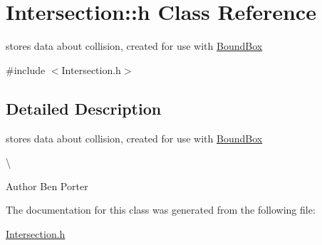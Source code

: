 \hypertarget{class_intersection_1_1h}{}\section{Intersection\+:\+:h Class Reference}
\label{class_intersection_1_1h}


stores data about collision, created for use with \hyperlink{class_bound_box}{Bound\+Box}  




{\ttfamily \#include $<$Intersection.\+h$>$}



\subsection{Detailed Description}
stores data about collision, created for use with \hyperlink{class_bound_box}{Bound\+Box} 

\textbackslash{}

\begin{DoxyAuthor}{Author}
Ben Porter 
\end{DoxyAuthor}


The documentation for this class was generated from the following file\+:\begin{DoxyCompactItemize}
\item 
\hyperlink{_intersection_8h}{Intersection.\+h}\end{DoxyCompactItemize}
